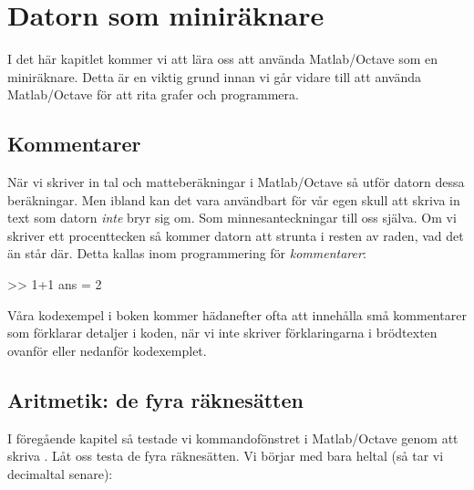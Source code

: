 %
%
\chapter{Datorn som miniräknare}\label{ch:datorn_som_raknemaskin}

I det här kapitlet kommer vi att lära oss att använda Matlab/Octave som en miniräknare. Detta är en viktig grund innan vi går vidare till att använda Matlab/Octave för att rita grafer och programmera.


\section{Kommentarer}

När vi skriver in tal och matteberäkningar i Matlab/Octave så utför datorn dessa beräkningar. Men ibland kan det vara användbart för vår egen skull att skriva in text som datorn \emph{inte} bryr sig om. Som minnesanteckningar till oss själva. Om vi skriver ett procenttecken \cw{\%} så kommer datorn att strunta i resten av raden, vad det än står där. Detta kallas inom programmering för \emph{kommentarer}:

\begin{matlab}[caption={Vår första kommentar},label={}]
>> 1+1 %
ans = 2
\end{matlab}

Våra kodexempel i boken kommer hädanefter ofta att innehålla små kommentarer som förklarar detaljer i koden, när vi inte skriver förklaringarna i brödtexten ovanför eller nedanför kodexemplet.
\newpage
\section{Aritmetik: de fyra räknesätten}
I föregående kapitel så testade vi kommandofönstret i Matlab/Octave genom att skriva . Låt oss testa de fyra räknesätten. Vi börjar med bara heltal (så tar vi decimaltal senare):

